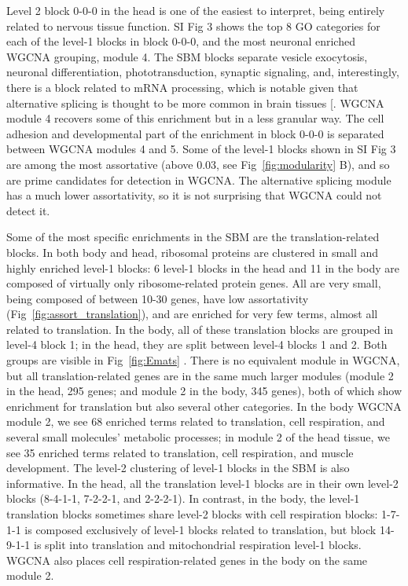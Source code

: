 \documentclass[
]{article}
\begin{document}
Level 2 block 0-0-0 in the head is one of the easiest to interpret,
being entirely related to nervous tissue function. SI Fig 3 shows the
top 8 GO categories for each of the level-1 blocks in block 0-0-0, and
the most neuronal enriched WGCNA grouping, module 4. The SBM blocks
separate vesicle exocytosis, neuronal differentiation,
phototransduction, synaptic signaling, and, interestingly, there is a
block related to mRNA processing, which is notable given that
alternative splicing is thought to be more common in brain tissues
{[}\citeproc{ref-Su2018-nz}{32}{]}. WGCNA module 4 recovers some of this
enrichment but in a less granular way. The cell adhesion and
developmental part of the enrichment in block 0-0-0 is separated between
WGCNA modules 4 and 5. Some of the level-1 blocks shown in SI Fig 3 are
among the most assortative (above 0.03, see Fig~\ref{fig:modularity} B),
and so are prime candidates for detection in WGCNA. The alternative
splicing module has a much lower assortativity, so it is not surprising
that WGCNA could not detect it.

Some of the most specific enrichments in the SBM are the
translation-related blocks. In both body and head, ribosomal proteins
are clustered in small and highly enriched level-1 blocks: 6 level-1
blocks in the head and 11 in the body are composed of virtually only
ribosome-related protein genes. All are very small, being composed of
between 10-30 genes, have low assortativity
(Fig~\ref{fig:assort_translation}), and are enriched for very few terms,
almost all related to translation. In the body, all of these translation
blocks are grouped in level-4 block 1; in the head, they are split
between level-4 blocks 1 and 2. Both groups are visible in
Fig~\ref{fig:Emats} . There is no equivalent module in WGCNA, but all
translation-related genes are in the same much larger modules (module 2
in the head, 295 genes; and module 2 in the body, 345 genes), both of
which show enrichment for translation but also several other categories.
In the body WGCNA module 2, we see 68 enriched terms related to
translation, cell respiration, and several small molecules' metabolic
processes; in module 2 of the head tissue, we see 35 enriched terms
related to translation, cell respiration, and muscle development. The
level-2 clustering of level-1 blocks in the SBM is also informative. In
the head, all the translation level-1 blocks are in their own level-2
blocks (8-4-1-1, 7-2-2-1, and 2-2-2-1). In contrast, in the body, the
level-1 translation blocks sometimes share level-2 blocks with cell
respiration blocks: 1-7-1-1 is composed exclusively of level-1 blocks
related to translation, but block 14-9-1-1 is split into translation and
mitochondrial respiration level-1 blocks. WGCNA also places cell
respiration-related genes in the body on the same module 2.
\end{document}
